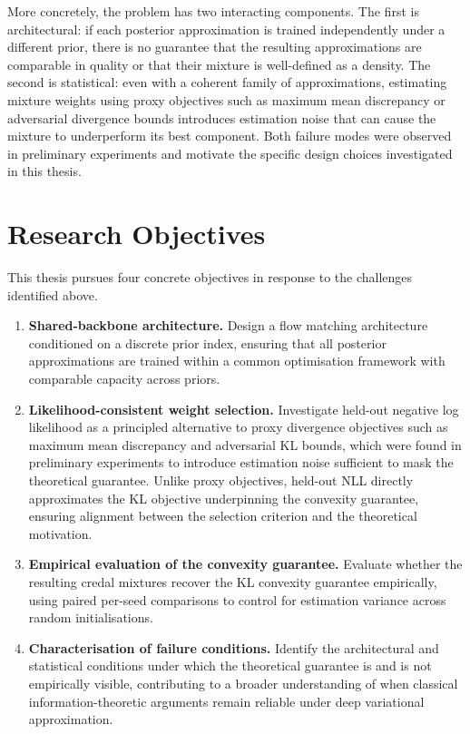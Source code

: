 More concretely, the problem has two interacting components. The first 
is architectural: if each posterior approximation is trained independently 
under a different prior, there is no guarantee that the resulting 
approximations are comparable in quality or that their mixture is 
well-defined as a density. The second is statistical: even with a 
coherent family of approximations, estimating mixture weights using 
proxy objectives such as maximum mean discrepancy or adversarial 
divergence bounds introduces estimation noise that can cause the mixture 
to underperform its best component. Both failure modes were observed in 
preliminary experiments and motivate the specific design choices 
investigated in this thesis.

\section{Research Objectives}

This thesis pursues four concrete objectives in response to the 
challenges identified above.

\begin{enumerate}
    \item \textbf{Shared-backbone architecture.} Design a flow matching 
    architecture conditioned on a discrete prior index, ensuring that 
    all posterior approximations are trained within a common optimisation 
    framework with comparable capacity across priors.

    \item \textbf{Likelihood-consistent weight selection.} Investigate 
    held-out negative log likelihood as a principled alternative to proxy 
    divergence objectives such as maximum mean discrepancy and adversarial 
    KL bounds, which were found in preliminary experiments to introduce 
    estimation noise sufficient to mask the theoretical guarantee. Unlike 
    proxy objectives, held-out NLL directly approximates the KL objective 
    underpinning the convexity guarantee, ensuring alignment between the 
    selection criterion and the theoretical motivation.

    \item \textbf{Empirical evaluation of the convexity guarantee.} 
    Evaluate whether the resulting credal mixtures recover the KL 
    convexity guarantee empirically, using paired per-seed comparisons 
    to control for estimation variance across random initialisations.

    \item \textbf{Characterisation of failure conditions.} Identify the 
    architectural and statistical conditions under which the theoretical 
    guarantee is and is not empirically visible, contributing to a broader 
    understanding of when classical information-theoretic arguments remain 
    reliable under deep variational approximation.
\end{enumerate}

